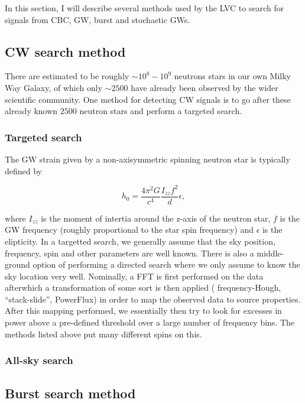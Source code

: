 In this section, I will describe several methods used by the 
\ac{LVC} to search for signals from \ac{CBC}, \ac{GW}, burst and 
stochastic \ac{GW}s.

\subsection{\ac{CW} search method}

There are estimated to be roughly $\sim 10^{8} - 10^{9}$ neutrons stars 
in our own Milky Way Galaxy, of which only $\sim 2500$ have already 
been observed by the wider scientific community. One method for detecting 
\ac{CW} signals is to go after these already known $2500$ neutron 
stars and perform a targeted search.

\subsubsection{Targeted search}
The GW strain given by a non-axisymmetric spinning neutron star 
is typically defined by 

\begin{equation}
    h_{0} = \frac{4\pi^2G}{c^4} \frac{I_{zz} f^2}{d} \epsilon,
\end{equation}

where $I_{zz}$ is the moment of intertia around the z-axis of the 
neutron star, $f$ is the \ac{GW} frequency (roughly proportional to 
the star spin frequency) and $\epsilon$ is the elipticity. In a targetted 
search, we generally assume that the sky position, frequency, spin and 
other parameters are well known. There is also a middle-ground option of 
performing a directed search where we only assume to know the sky location 
very well. Nominally, a \ac{FFT} is first performed on the 
data afterwhich a transformation of some sort is then applied (
frequency-Hough, ``stack-slide'', PowerFlux) in order to 
map the observed data to source properties. After this mapping performed, 
we essentially then try to look for excesses in power above 
a pre-defined threshold over a large number of frequency bins. The 
methods listed above put many different spins on this\cite{PhysRevD.90.042002}.

\subsubsection{All-sky search}

\subsection{Burst search method}

